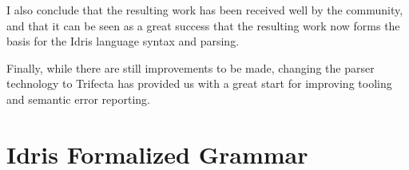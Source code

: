 \documentclass[a4paper]{article}%
\begin{document}
I also conclude that the resulting work has been received well by the community, and that it can be seen as a great success that the resulting work now forms the basis for
the Idris language syntax and parsing.

Finally, while there are still improvements to be made, changing the parser technology to Trifecta has provided us with a great start for improving tooling and semantic error reporting.





\pagebreak
\appendix
\section{Idris Formalized Grammar}
\label{sec:IdrisFormalizedGrammar}
  
\end{document}
